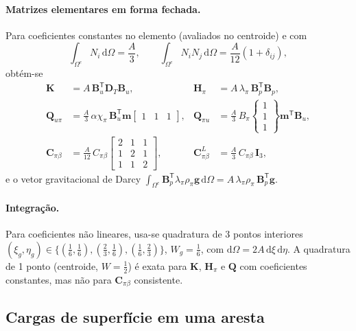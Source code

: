 \documentclass[11pt,a4paper]{article}
\numberwithin{equation}{section}
\newcommand{\dd}{\mathrm{d}}
\begin{document}
\paragraph{Matrizes elementares em forma fechada.} Para coeficientes
constantes no elemento (avaliados no centroide) e com
\begin{equation}
\int_{\Omega^e}N_i\,\dd\Omega=\frac A3,\qquad
\int_{\Omega^e}N_iN_j\,\dd\Omega=\frac{A}{12}(1+\delta_{ij}),
\end{equation}
obtém-se
\begin{align}
\mathbf K&=A\,\mathbf B_u^{\mathsf T}\mathbf D_T\mathbf B_u, &
\mathbf H_\pi&=A\,\lambda_\pi\,\mathbf B_p^{\mathsf T}\mathbf B_p,\\
\mathbf Q_{u\pi}&=\frac A3\,\alpha\chi_\pi\,\mathbf B_u^{\mathsf T}\mathbf m
\begin{bmatrix}1&1&1\end{bmatrix}, &
\mathbf Q_{\pi u}&=\frac A3\,B_\pi
\begin{Bmatrix}1\\1\\1\end{Bmatrix}\mathbf m^{\mathsf T}\mathbf B_u,\\
\mathbf C_{\pi\beta}&=\frac{A}{12}\,C_{\pi\beta}
\begin{bmatrix}2&1&1\\1&2&1\\1&1&2\end{bmatrix}, &
\mathbf C_{\pi\beta}^{L}&=\frac A3\,C_{\pi\beta}\,\mathbf I_3,
\end{align}
e o vetor gravitacional de Darcy
$\int_{\Omega^e}\mathbf B_p^{\mathsf T}\lambda_\pi\rho_\pi\mathbf g\,\dd\Omega
=A\,\lambda_\pi\rho_\pi\,\mathbf B_p^{\mathsf T}\mathbf g$.

\paragraph{Integração.} Para coeficientes não lineares, usa-se
quadratura de 3 pontos interiores
$(\xi_g,\eta_g)\in\{(\tfrac16,\tfrac16),(\tfrac23,\tfrac16),(\tfrac16,\tfrac23)\}$,
$W_g=\tfrac16$, com $\dd\Omega=2A\,\dd\xi\,\dd\eta$. A quadratura de
1 ponto (centroide, $W=\tfrac12$) é exata para $\mathbf K$, $\mathbf H_\pi$ e $\mathbf Q$
com coeficientes constantes, mas não para $\mathbf C_{\pi\beta}$ consistente.

\subsection{Cargas de superfície em uma aresta}
\end{document}
